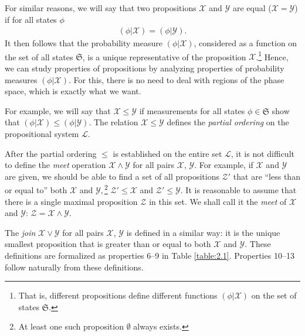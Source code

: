 \documentclass[nochecklpage]{stefan1}
\theoremstyle{definition}
\begin{document}
For similar reasons, we will say that two propositions $ \mathcal{X} $
and $ \mathcal{Y} $ are equal ($ \mathcal{X} = \mathcal{Y} $) if for all
states $ \phi $\vspace*{-3.5pt}
%
\begin{align}
(\phi |\mathcal{X}) = (\phi |\mathcal{Y}). \label{eq:(4.1)}
\end{align}
%
It then follows that the probability measure $ (\phi | \mathcal{X}) $,
considered as a function on the set of all states $ \mathfrak{S} $, is
a unique representative of the proposition $ \mathcal{X}
$.\footnote{That is, different propositions define different functions
$ (\phi | \mathcal{X}) $ on the set of states $ \mathfrak{S} $.} Hence,
we can study properties of propositions by analyzing properties of
probability measures $ (\phi | \mathcal{X}) $. For this, there is no
need to deal with regions of the phase space, which is exactly what we
want.

For example, we will say that $ \mathcal{X} \leq \mathcal{Y} $ if
measurements for all states $ \phi \in \mathfrak{S} $ show that
$ (\phi | \mathcal{X}) \leq (\phi | \mathcal{Y}) $. The relation
$ \mathcal{X} \leq \mathcal{Y} $ defines the \emph{partial ordering}
 on the propositional system $ \mathcal{L} $.

After the partial ordering $ \leq $ is established on the entire set
$ \mathcal{L} $, it is not difficult to define the \emph{meet} operation
$ \mathcal{X} \wedge \mathcal{Y} $ for all pairs $ \mathcal{X} $,
$ \mathcal{Y} $. For example, if $ \mathcal{X} $ and $\mathcal{Y} $ are
given, we should be able to find a set of all propositions $ \mathcal{Z}'
$ that are ``less than or equal to'' both $ \mathcal{X} $ and
$ \mathcal{Y,} $\footnote{At least one such proposition $ \emptyset
$ always exists.} $ \mathcal{Z}' \leq \mathcal{X} $ and $ \mathcal{Z}' \leq \mathcal{Y} $.
It is reasonable to assume that there is a single maximal proposition
$\mathcal{Z} $ in this set. We shall call it the \emph{meet} of
$\mathcal{X}$ and $\mathcal{Y}$: $\mathcal{Z} = \mathcal{X} \wedge
\mathcal{Y}$.

The \emph{join} $ \mathcal{X} \vee \mathcal{Y} $ for all pairs
$ \mathcal{X}$, $ \mathcal{Y} $ is defined in a similar way: it is the
unique smallest proposition that is greater than or equal to both
$ \mathcal{X}$ and $ \mathcal{Y} $. These definitions are formalized as
properties 6--9 in Table \ref{table:2.1}. Properties 10--13 follow
naturally from these definitions.
\end{document}
